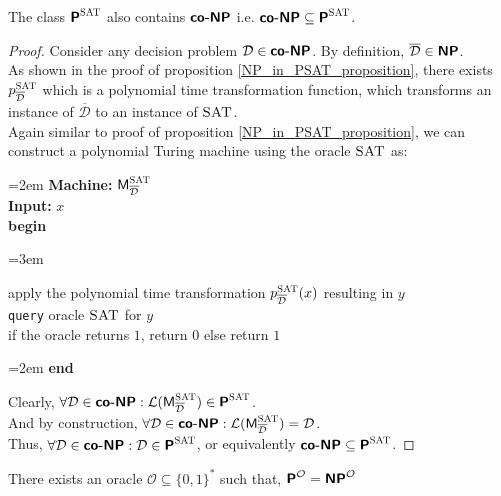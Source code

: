 \documentclass[usletter]{article}
\newcommand{\collection}[1]
           {\ensuremath{\mathcal{#1}}}
\newcommand{\namedcollection}[1]
           {\ensuremath{\textnormal{\textsc{#1}}}}
\newcommand{\machine}[1]
           {\ensuremath{\textnormal{\textsf{#1}}}}
\newcommand{\family}[1]
           {\ensuremath{\textnormal{\textsf{\textbf{#1}}}}}
\newenvironment{turing}[2]{
  \par\smallskip\leftskip=2em
  \noindent\ignorespaces
  \textbf{Machine:} #1\\
  \textbf{Input:} #2\\[5pt]
  \textbf{begin}
  \par\leftskip=3em
  \noindent\ignorespaces
}{
  \par\leftskip=2em
  \noindent\ignorespaces
  \textbf{end}
  \par\medskip
}
\begin{document}
\begin{proposition}
The class $\family{P}^\namedcollection{SAT}$ also contains \family{co-NP} i.e. $\family{co-NP} \subseteq \family{P}^\namedcollection{SAT}$.
\end{proposition}

\begin{proof}
Consider any decision problem $\collection{D} \in \family{co-NP}$. By definition, $\overline{\collection{D}} \in \family{NP}$. \\
As shown in the proof of proposition \ref{NP_in_PSAT_proposition}, there exists $p_{\overline{\collection{D}}}^\namedcollection{SAT}$ which is a polynomial time transformation function, which transforms an instance of $\overline{\collection{D}}$ to an instance of \namedcollection{SAT}. \\

\noindent
Again similar to proof of proposition \ref{NP_in_PSAT_proposition}, we can construct a polynomial Turing machine using the oracle \namedcollection{SAT} as:
\begin{turing}{$\machine{M}^\namedcollection{SAT}_{\overline{\collection{D}}}$}{$x$}
  apply the polynomial time transformation $p_{\overline{\collection{D}}}^\namedcollection{SAT}(x)$ resulting in $y$\\
  \texttt{query} oracle \namedcollection{SAT} for $y$ \\
  if the oracle returns $1$, return $0$ else return $1$
\end{turing}

\noindent
Clearly, $\forall \collection{D} \in \family{co-NP} : \collection{L}(\machine{M}^\namedcollection{SAT}_{\overline{\collection{D}}}) \in \family{P}^\namedcollection{SAT}$. \\
And by construction, $\forall \collection{D} \in \family{co-NP} : \collection{L}(\machine{M}^\namedcollection{SAT}_{\overline{\collection{D}}}) = \collection{D}$. \\

\noindent
Thus, $\forall \collection{D} \in \family{co-NP} : \collection{D} \in \family{P}^\namedcollection{SAT}$, or equivalently $ \family{co-NP} \subseteq \family{P}^\namedcollection{SAT}$.
\end{proof}

\begin{theorem}
There exists an oracle $\collection{O} \subseteq \{0,1\}^*$ such that, $\family{P}^\collection{O} = \family{NP}^\collection{O}$
\end{theorem}
\end{document}
